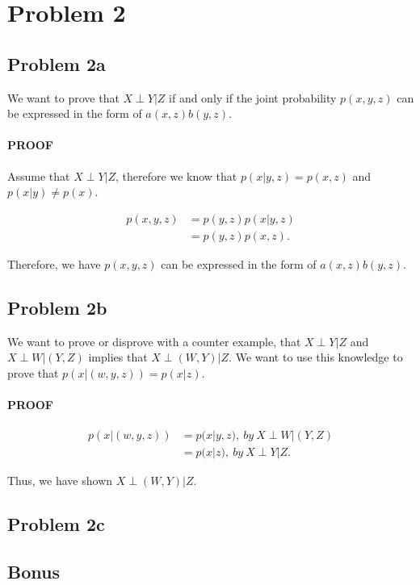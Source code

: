 \documentclass[paper=a4, fontsize=11pt]{scrartcl} %
\begin{document}

\section{Problem 2}
\subsection{Problem 2a}
We want to prove that $X \perp Y|Z$ if and only if the joint probability $p(x,y,z)$ can be expressed in the form of $a(x,z)b(y,z)$.
\paragraph{PROOF}
Assume that $X \perp Y|Z$, therefore we know that $p(x|y,z) = p(x,z)$ and $p(x|y) \neq p(x)$.

\begin{align}
p(x,y,z) &= p(y,z)p(x|y,z) \\
&= p(y,z)p(x,z).
\end{align}

Therefore, we have $p(x,y,z)$ can be expressed in the form of $a(x,z)b(y,z)$.

\subsection{Problem 2b}
 We want to prove or disprove with a counter example, that $X \perp Y|Z$ and $X \perp W|(Y,Z)$ implies that $X \perp (W,Y)|Z$.
We want to use this knowledge to prove that $p(x|(w,y,z)) = p(x|z)$.

\paragraph{PROOF}
\begin{align}
p(x|(w,y,z)) &= p(x|y,z),\ by \ X \perp W|(Y,Z) \\
&= p(x|z), \ by \  X \perp Y|Z.
\end{align}

Thus, we have shown $X \perp (W,Y)|Z$.

\subsection{Problem 2c}

\subsection{Bonus}
\end{document}
